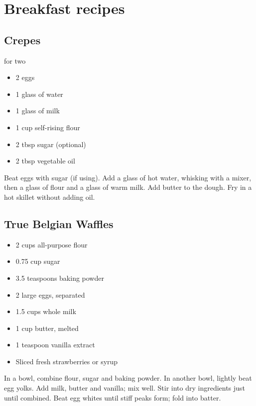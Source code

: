 \documentclass[
]{book}
\providecommand{\tightlist}{%
  \setlength{\itemsep}{0pt}\setlength{\parskip}{0pt}}
\begin{document}
\hypertarget{breakfast-recipes}{%
\chapter{Breakfast recipes}\label{breakfast-recipes}}

\hypertarget{crepes}{%
\section{Crepes}\label{crepes}}

for two

\begin{itemize}
\tightlist
\item
  2 eggs
\item
  1 glass of water
\item
  1 glass of milk
\item
  1 cup self-rising flour
\item
  2 tbsp sugar (optional)
\item
  2 tbsp vegetable oil
\end{itemize}

Beat eggs with sugar (if using). Add a glass of hot water, whisking with a mixer, then a glass of flour and a glass of warm milk.
Add butter to the dough. Fry in a hot skillet without adding oil.

\hypertarget{true-belgian-waffles}{%
\section{True Belgian Waffles}\label{true-belgian-waffles}}

\begin{itemize}
\tightlist
\item
  2 cups all-purpose flour
\item
  0.75 cup sugar
\item
  3.5 teaspoons baking powder
\item
  2 large eggs, separated
\item
  1.5 cups whole milk
\item
  1 cup butter, melted
\item
  1 teaspoon vanilla extract
\item
  Sliced fresh strawberries or syrup
\end{itemize}

In a bowl, combine flour, sugar and baking powder. In another bowl, lightly beat egg yolks. Add milk, butter and vanilla; mix well. Stir into dry ingredients just until combined. Beat egg whites until stiff peaks form; fold into batter.
\end{document}
